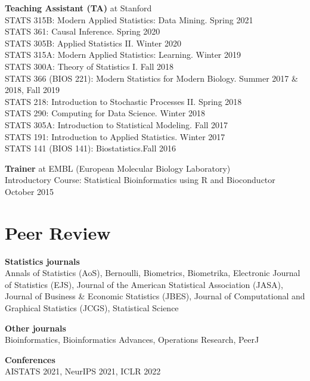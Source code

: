 \documentclass[margin,line]{res}
\newcommand{\ver}{\vspace*{-2.7mm}}
\begin{document}
\begin{resume}
\ver
\textbf{Teaching Assistant (TA)} at Stanford\\
STATS 315B: Modern Applied Statistics: Data Mining. \hfill Spring 2021\\ 
STATS 361: Causal Inference. \hfill Spring 2020\\
STATS 305B: Applied Statistics II. \hfill Winter 2020\\
STATS 315A: Modern Applied Statistics: Learning. \hfill Winter 2019\\
STATS 300A: Theory of Statistics I. \hfill Fall 2018\\
STATS 366 (BIOS 221): Modern Statistics for Modern Biology. \hfill Summer 2017 \& 2018, Fall 2019\\
STATS 218: Introduction to Stochastic Processes II. \hfill Spring 2018\\
STATS 290: Computing for Data Science. \hfill Winter 2018\\
STATS 305A: Introduction to Statistical Modeling. \hfill Fall 2017\\
STATS 191: Introduction to Applied Statistics. \hfill Winter 2017\\
STATS 141 (BIOS 141): Biostatistics.\hfill Fall 2016

\ver
\textbf{Trainer} at EMBL (European Molecular Biology Laboratory)\\
Introductory Course: Statistical Bioinformatics using R and Bioconductor \hfill October 2015




\section{\sc Peer Review}

\textbf{Statistics journals}\\
Annals of Statistics (AoS), Bernoulli, Biometrics, Biometrika, Electronic Journal of Statistics (EJS), Journal of the American Statistical Association (JASA), Journal of Business \& Economic Statistics (JBES), Journal of Computational and Graphical Statistics (JCGS), Statistical Science

\ver

\textbf{Other journals}\\
Bioinformatics, Bioinformatics Advances, Operations Research, PeerJ

\ver
\textbf{Conferences}\\
AISTATS 2021, NeurIPS 2021, ICLR 2022







\end{resume}
\end{document}
